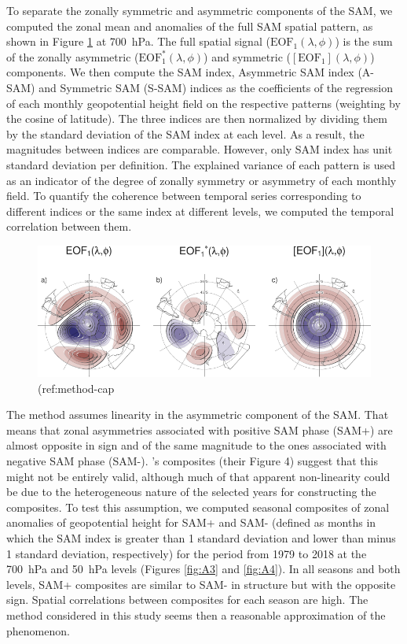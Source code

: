 \documentclass[smallextended]{svjour3}       %
\begin{document}
To separate the zonally symmetric and asymmetric components of the SAM, we computed the zonal mean and anomalies of the full SAM spatial pattern, as shown in Figure \ref{fig:method} at 700~hPa.
The full spatial signal (\(\mathrm{EOF_1}(\lambda, \phi)\)) is the sum of the zonally asymmetric (\(\mathrm{EOF_1^*}(\lambda, \phi)\)) and symmetric (\([\mathrm{EOF_1}](\lambda, \phi)\)) components.
We then compute the SAM index, Asymmetric SAM index (A\nobreakdash-SAM) and Symmetric SAM (S\nobreakdash-SAM) indices as the coefficients of the regression of each monthly geopotential height field on the respective patterns (weighting by the cosine of latitude).
The three indices are then normalized by dividing them by the standard deviation of the SAM index at each level.
As a result, the magnitudes between indices are comparable.
However, only SAM index has unit standard deviation per definition.
The explained variance of each pattern is used as an indicator of the degree of zonally symmetry or asymmetry of each monthly field.
To quantify the coherence between temporal series corresponding to different indices or the same index at different levels, we computed the temporal correlation between them.



\begin{figure}
\includegraphics{method-1} \caption{(ref:method-cap}\label{fig:method}
\end{figure}

The method assumes linearity in the asymmetric component of the SAM.
That means that zonal asymmetries associated with positive SAM phase (SAM+) are almost opposite in sign and of the same magnitude to the ones associated with negative SAM phase (SAM-).
\citet{fogt2012}'s composites (their Figure 4) suggest that this might not be entirely valid, although much of that apparent non-linearity could be due to the heterogeneous nature of the selected years for constructing the composites.
To test this assumption, we computed seasonal composites of zonal anomalies of geopotential height for SAM+ and SAM- (defined as months in which the SAM index is greater than 1 standard deviation and lower than minus 1 standard deviation, respectively) for the period from 1979 to 2018 at the 700~hPa and 50~hPa levels (Figures \ref{fig:A3} and \ref{fig:A4}).
In all seasons and both levels, SAM+ composites are similar to SAM- in structure but with the opposite sign.
Spatial correlations between composites for each season are high.
The method considered in this study seems then a reasonable approximation of the phenomenon.
\end{document}
